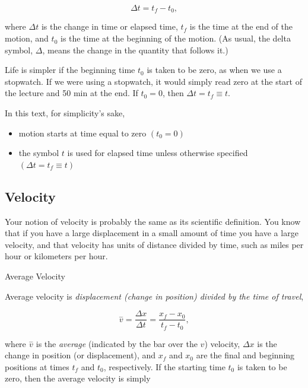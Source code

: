 \documentclass[
]{book}
\providecommand{\tightlist}{%
  \setlength{\itemsep}{0pt}\setlength{\parskip}{0pt}}
\begin{document}
\leavevmode{}%
\[\Delta t = {t_{f} - t_{0}},\]

where \({\Delta t}{}\) is the change in time or elapsed time, \(t_{f}{}\) is
the time at the end of the motion, and \(t_{0}{}\) is the time at the
beginning of the motion. (As usual, the delta symbol, \(\Delta{}\), means
the change in the quantity that follows it.)

Life is simpler if the beginning time \(t_{0}{}\) is taken to be zero, as
when we use a stopwatch. If we were using a stopwatch, it would simply
read zero at the start of the lecture and 50 min at the end. If
\(t_{0} = 0\), then \({\Delta t = t_{f}} \equiv t\).

In this text, for simplicity's sake,

\begin{itemize}
\tightlist
\item
  \protect\hypertarget{import-auto-id2571110}{}{motion starts at time equal to zero
  \({({t_{0} = 0})}{}\)}
\item
  \protect\hypertarget{import-auto-id4047929}{}{the symbol \(t{}\) is used for elapsed time unless otherwise
  specified
  \({({{\Delta t = t_{f}} \equiv t})}{}\)}
\end{itemize}

\hypertarget{fs-id1850777}{}
\hypertarget{velocity}{%
\subsection{Velocity}\label{velocity}}

Your notion of velocity is probably the same as its scientific
definition. You know that if you have a large displacement in a small
amount of time you have a large velocity, and that velocity has units of
distance divided by time, such as miles per hour or kilometers per hour.

\hypertarget{fs-id3597968}{}
Average Velocity

\protect\hypertarget{import-auto-id2596035}{}{Average velocity} is
\emph{displacement (change in position) divided by the time of travel},

\leavevmode{}%
\[{{{\overset{-}{v} = \frac{\Delta x}{\Delta t}} = \frac{x_{f} - x_{0}}{t_{f} - t_{0}}},}{}\]

where \(\overset{-}{v}{}\) is the \emph{average} (indicated by the bar over the
\(v{}\)) velocity, \({\Delta x}{}\) is the change in position (or
displacement), and \(x_{f}{}\) and \(x_{0}\) are the final and beginning
positions at times \(t_{f}\) and \(t_{0}\), respectively. If the starting
time \(t_{0}\) is taken to be zero, then the average velocity is simply
\end{document}
